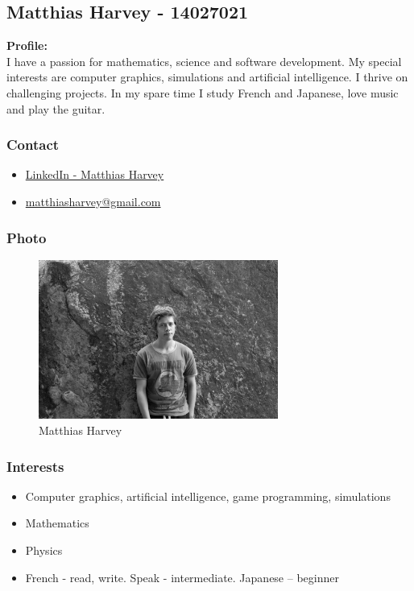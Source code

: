 \documentclass{article}
\begin{document}
	\cleardoublepage

	\subsection{Matthias Harvey - 14027021}
	\textbf{Profile:}\\
	I have a passion for mathematics, science and software development. My special interests are computer graphics, simulations and artificial intelligence. I thrive on challenging projects. In my spare time I study French and Japanese, love music and play the guitar.
	\subsubsection{Contact}
	\begin{itemize}
		\item \href{https://za.linkedin.com/in/matthias-harvey-68b30995}{LinkedIn - Matthias Harvey}
		\item \href{mailto:matthiasharvey@gmail.com}{matthiasharvey@gmail.com}	
	\end{itemize}
	\subsubsection{Photo}
	\begin{figure}[H]
		\centering
		\includegraphics[width=0.7\textwidth]{../matthias.jpg}
		\caption{Matthias Harvey}
	\end{figure}
	\subsubsection{Interests}
	\begin{itemize}
		\item Computer graphics, artificial intelligence, game programming, simulations
		\item Mathematics
		\item Physics
		\item French - read, write. Speak - intermediate. Japanese – beginner
	\end{itemize}
\end{document}
